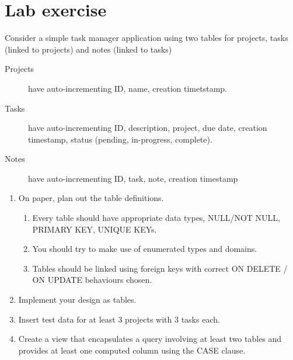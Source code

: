 \documentclass{pgnotes}
\begin{document}
\section{Lab exercise}


Consider a simple task manager application using two tables for projects, tasks (linked to projects) and notes (linked to tasks)
\begin{description}
\item[Projects] have auto-incrementing ID, name, creation timetstamp.
\item[Tasks] have auto-incrementing ID, description, project, due date, creation timestamp, status (pending, in-progress, complete).
\item[Notes] have auto-incrementing ID, task, note, creation timestamp
\end{description}

\begin{enumerate}
\item On paper, plan out the table definitions.
  \begin{enumerate}
  \item Every table should have appropriate data types, NULL/NOT NULL, PRIMARY KEY, UNIQUE KEYs.
  \item You should try to make use of enumerated types and domains.
  \item Tables should be linked using foreign keys with correct ON DELETE / ON UPDATE behaviours chosen.
  \end{enumerate}
\item Implement your design as tables.
\item Insert test data for at least 3 projects with 3 tasks each. 
\item Create a view that encapsulates a query involving at least two tables and provides at least one computed column using the CASE clause. 
\end{enumerate}
\end{document}
